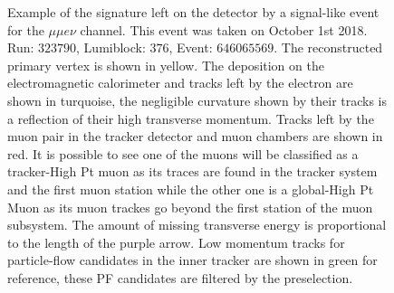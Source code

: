 \begin{figure}
  \centering
  \vfil
  \caption{Example of the signature left on the detector by a signal-like event
    for the $\mu\mu e \nu$ channel. This event was taken on October 1st 2018.
    Run: $323790$, Lumiblock: $376$, Event: $646065569$. The reconstructed primary vertex is shown in yellow.
    The deposition on the electromagnetic calorimeter and tracks left by the electron are shown in turquoise,
    the negligible curvature shown by their tracks is a reflection of their high transverse momentum.
    Tracks left by the muon pair in the tracker detector and muon chambers are shown in red. It
    is possible to see one of the muons will be classified as a tracker-High Pt muon as its traces
    are found in the tracker system and the first muon station while the other one is a global-High Pt
    Muon as its muon trackes go beyond the first station of the muon subsystem.
    The amount of missing
    transverse energy is proportional to the length of the purple arrow. Low momentum
    tracks for particle-flow candidates in the inner tracker are shown in green for
    reference, these PF candidates are filtered by the preselection. }
  \label{fig:Fireworks_mumuev}
\end{figure}
